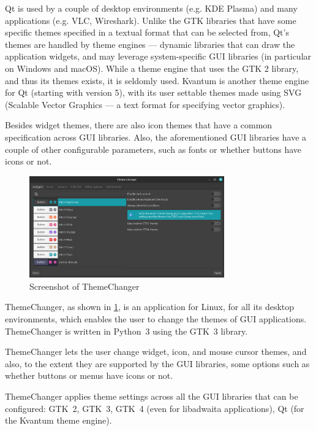 \documentclass{article}
\begin{document}
Qt is used by a couple of desktop environments (e.g. KDE Plasma) and many applications (e.g. VLC, Wireshark).
Unlike the GTK libraries that have some specific themes specified in a textual format that can be selected from, Qt's themes are handled by theme engines --- dynamic libraries that can draw the application widgets, and may leverage system-specific GUI libraries (in particular on Windows and macOS).
While a theme engine that uses the GTK 2 library\cite{qt5gtk2}, and thus its themes exists, it is seldomly used\cite{popcon}.
Kvantum is another theme engine for Qt (starting with version 5), with its user settable themes made using SVG (Scalable Vector Graphics --- a text format for specifying vector graphics).

Besides widget themes, there are also icon themes that have a common specification across GUI libraries.
Also, the aforementioned GUI libraries have a couple of other configurable parameters, such as fonts or whether buttons have icons or not.

\begin{figure}[h]
    \centering
    \includegraphics[width=0.75\textwidth]{screenshot1.png}
    \caption{Screenshot of ThemeChanger}
    \label{fig:screenshot1}
\end{figure}

ThemeChanger, as shown in \cref{fig:screenshot1}, is an application for Linux, for all its desktop environments, which enables the user to change the themes of GUI applications.
ThemeChanger is written in Python~3 using the GTK~3 library.

ThemeChanger lets the user change widget, icon, and mouse cursor themes, and also, to the extent they are supported by the GUI libraries, some options such as whether buttons or menus have icons or not.

ThemeChanger applies theme settings across all the GUI libraries that can be configured: GTK~2, GTK~3, GTK~4 (even for libadwaita applications), Qt (for the Kvantum theme engine).
\end{document}
